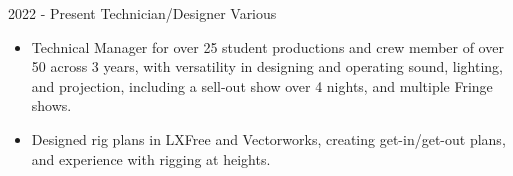 \documentclass[../../cv-tech.tex]{subfiles}
\begin{document}
\cvevent
{2022 - Present}
	{Technician/Designer}
	{Various}
	{\begin{itemize}
			\item Technical Manager for over 25 student productions and crew member of over 50 across 3 years, with versatility in designing and operating sound, lighting, and projection, including a sell-out show over 4 nights, and multiple Fringe shows.
			\item Designed rig plans in LXFree and Vectorworks, creating get-in/get-out plans, and experience with rigging at heights. 
	\end{itemize}
}

\vfill\null
\end{document}
